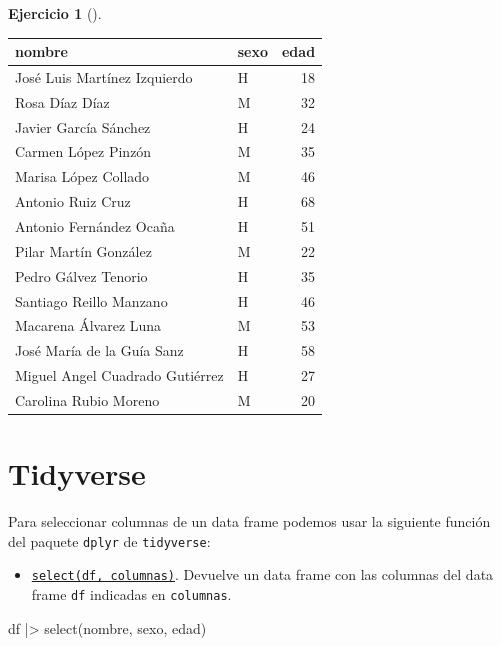 \documentclass[
  a4paper,
]{scrreport}
\newenvironment{Shaded}{\begin{snugshade}}{\end{snugshade}}
\newcommand{\FunctionTok}[1]{\textcolor[rgb]{0.28,0.35,0.67}{#1}}
\newcommand{\NormalTok}[1]{\textcolor[rgb]{0.00,0.23,0.31}{#1}}
\newcommand{\SpecialCharTok}[1]{\textcolor[rgb]{0.37,0.37,0.37}{#1}}
\providecommand{\tightlist}{%
  \setlength{\itemsep}{0pt}\setlength{\parskip}{0pt}}\usepackage{longtable,booktabs,array}
\theoremstyle{definition}
\newtheorem{exercise}{Ejercicio}[chapter]
\theoremstyle{remark}
\begin{document}
\begin{exercise}[]
\begin{enumerate}
\begin{tcolorbox}
  \begin{longtable}[]{@{}llr@{}}
  \toprule\noalign{}
  nombre & sexo & edad \\
  \midrule\noalign{}
  \endhead
  \bottomrule\noalign{}
  \endlastfoot
  José Luis Martínez Izquierdo & H & 18 \\
  Rosa Díaz Díaz & M & 32 \\
  Javier García Sánchez & H & 24 \\
  Carmen López Pinzón & M & 35 \\
  Marisa López Collado & M & 46 \\
  Antonio Ruiz Cruz & H & 68 \\
  Antonio Fernández Ocaña & H & 51 \\
  Pilar Martín González & M & 22 \\
  Pedro Gálvez Tenorio & H & 35 \\
  Santiago Reillo Manzano & H & 46 \\
  Macarena Álvarez Luna & M & 53 \\
  José María de la Guía Sanz & H & 58 \\
  Miguel Angel Cuadrado Gutiérrez & H & 27 \\
  Carolina Rubio Moreno & M & 20 \\
  \end{longtable}

  \section{Tidyverse}

  Para seleccionar columnas de un data frame podemos usar la siguiente
  función del paquete \texttt{dplyr} de \texttt{tidyverse}:

  \begin{itemize}
  \tightlist
  \item
    \href{https://dplyr.tidyverse.org/reference/select.html}{\texttt{select(df,\ columnas)}}.
    Devuelve un data frame con las columnas del data frame \texttt{df}
    indicadas en \texttt{columnas}.
  \end{itemize}

\begin{Shaded}
\begin{Highlighting}[]
\NormalTok{df }\SpecialCharTok{|\textgreater{}} \FunctionTok{select}\NormalTok{(nombre, sexo, edad)}
\end{Highlighting}
\end{Shaded}


\end{tcolorbox}
\end{enumerate}
\end{exercise}
\end{document}
